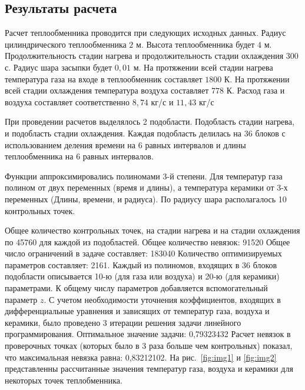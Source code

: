 \documentclass[a4paper,11pt,numreferences,mathsec,kaplist]{isuepsutf8}
\begin{document}
\begin{article}
\section{Результаты расчета}

Расчет теплообменника проводится при следующих исходных данных. Радиус
цилиндрического теплообменника $2$ м. Высота теплообменника будет $4$ м.
Продолжительность стадии нагрева и продолжительность стадии охлаждения
$300$ с. Радиус шара засыпки будет $0,01$ м. На протяжении всей стадии
нагрева температура газа на входе в теплообменник составляет $1800$ К.
На протяжении всей стадии охлаждения температура воздуха составляет
$778$ К. Расход газа и воздуха составляет соответственно $8,74$ кг/с и
$11,43$ кг/с

При проведении расчетов выделялось 2 подобласти. Подобласть стадии
нагрева, и подобласть стадии охлаждения. Каждая подобласть делилась на
36 блоков с использованием деления времени на 6 равных интервалов и
длины теплообменника на 6 равных интервалов.

Функции аппроксимировались полиномами 3-й степени. Для температур газа
полином от двух переменных (время и длины), а температура керамики от
3-х переменных (Длины, времени, и радиуса). По радиусу шара
располагалось 10 контрольных точек.

Общее количество контрольных точек, на стадии нагрева и на стадии
охлаждения по 45760 для каждой из подобластей. Общее количество
невязок: 91520 Общее число ограничений в задаче составляет: 183040
Количество оптимизируемых параметров составляет: 2161. Каждый из
полиномов, входящих в 36 блоков подобласти описывается 10-ю (для газа
или воздуха) и 20-ю (для керамики) параметрами. К общему числу
параметров добавляется вспомогательный параметр $z$. С учетом
необходимости уточнения коэффициентов, входящих в дифференциальные
уравнения и зависящих от температур газа, воздуха и керамики, было
проведено 3 итерации решения задачи линейного программирования.
Оптимальное значение задачи: 0,79323432 Расчет невязок в проверочных
точках (которых было в 3 раза больше чем контрольных) показал, что
максимальная невязка равна: 0,83212102. На рис.~\ref{fig:img1} и 
\ref{fig:img2} представленны рассчитанные значения температур газа,
воздуха и керамики для некоторых точек теплобменника.


\end{article}
\end{document}

